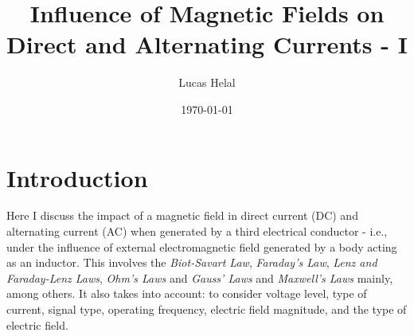 \documentclass[10pt]{article}
\begin{document}
\title{Influence of Magnetic Fields on Direct and Alternating Currents - I}
\date{\vfill
\today}
\author{Lucas Helal}
\maketitle
\newpage
\tableofcontents
\newpage
	\section{Introduction}
	Here I discuss the impact of a magnetic field in direct current (DC) and
	alternating current (AC) when generated by a third electrical conductor - i.e.,
	under the influence of external electromagnetic field generated by a body
	acting as an inductor. This involves the \emph{Biot-Savart Law}, \emph{Faraday's
	Law}, \emph{Lenz and Faraday-Lenz Laws}, \emph{Ohm's Laws} and \emph{Gauss' Laws}
	and \emph{Maxwell's Laws} mainly, among others. It also takes into account: to
	consider voltage level, type of current, signal type, operating frequency, electric
	field magnitude, and the type of electric field.
\end{document}
